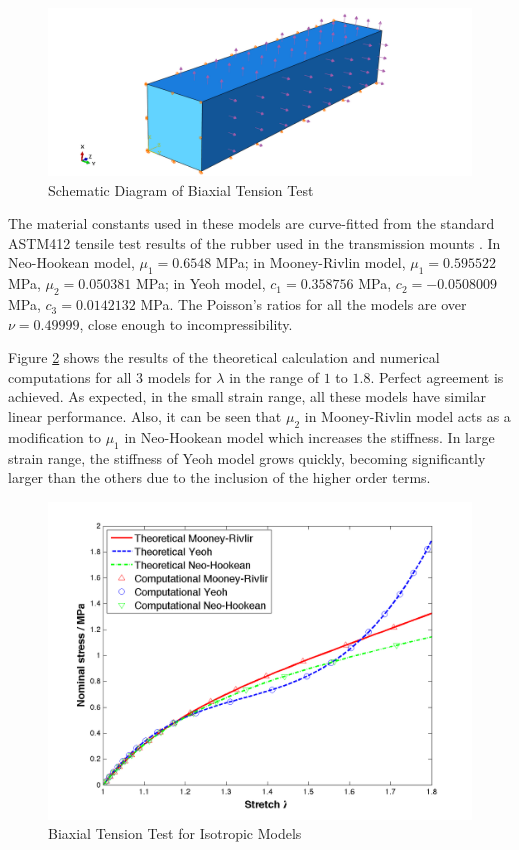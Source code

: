 \begin{figure}[h!]
\centering
\includegraphics[width=.8\textwidth]{./figures/biaxial_schematic.png}
\caption{Schematic Diagram of Biaxial Tension Test}
\label{fig:biaxial_schematic}
\end{figure}

The material constants used in these models are curve-fitted from the standard ASTM412 tensile test results of the rubber used in the transmission mounts \cite{Sharma}. In Neo-Hookean model, $\mu_1 = 0.6548$ MPa; in Mooney-Rivlin model, $\mu_1 = 0.595522$ MPa, $\mu_2 = 0.050381$ MPa; in Yeoh model, $c_1 = 0.358756$ MPa, $c_2 = - 0.0508009$ MPa, $c_3 = 0.0142132$ MPa. The Poisson's ratios for all the models are over $\nu = 0.49999$, close enough to incompressibility.

Figure \ref{fig:biaxial1} shows the results of the theoretical calculation and numerical computations for all $3$ models for $\lambda$ in the range of $1$ to $1.8$. Perfect agreement is achieved. As expected, in the small strain range, all these models have similar linear performance. Also, it can be seen that $\mu_2$ in Mooney-Rivlin model acts as a modification to $\mu_1$ in Neo-Hookean model which increases the stiffness. In large strain range, the stiffness of Yeoh model grows quickly, becoming significantly larger than the others due to the inclusion of the higher order terms.

\begin{figure}[h!]
\centering
\includegraphics[width=.6\textwidth]{./figures/biaxial1.png}
\caption{Biaxial Tension Test for Isotropic Models}
\label{fig:biaxial1}
\end{figure}

